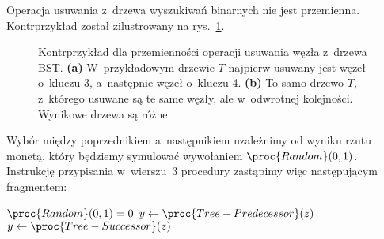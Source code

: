 \exercise %
Operacja usuwania z~drzewa wyszukiwań binarnych nie jest przemienna. Kontrprzykład został zilustrowany na rys.\ \ref{fig:12.3-5}.
\begin{figure}[!ht]
	\centering 
	\caption{Kontrprzykład dla przemienności operacji usuwania węzła z~drzewa BST.
{\sffamily\bfseries(a)} W~przykładowym drzewie $T$ najpierw usuwany jest węzeł o~kluczu 3, a~następnie węzeł o~kluczu 4.
{\sffamily\bfseries(b)} To samo drzewo $T$, z~którego usuwane są te same węzły, ale w~odwrotnej kolejności.
Wynikowe drzewa są różne.} \label{fig:12.3-5}
\end{figure}

\exercise %
Wybór między poprzednikiem a~następnikiem uzależnimy od wyniku rzutu monetą, który będziemy symulować wywołaniem $\proc{Random}(0,1)$.
Instrukcję przypisania w~wierszu~3 procedury  zastąpimy więc następującym fragmentem:
\begin{codebox}
\zi	\If $\proc{Random}(0,1)=0$
\zi		\Then $y\gets\proc{Tree-Predecessor}(z)$
\zi		\Else $y\gets\proc{Tree-Successor}(z)$
\zi		\End
\end{codebox}
